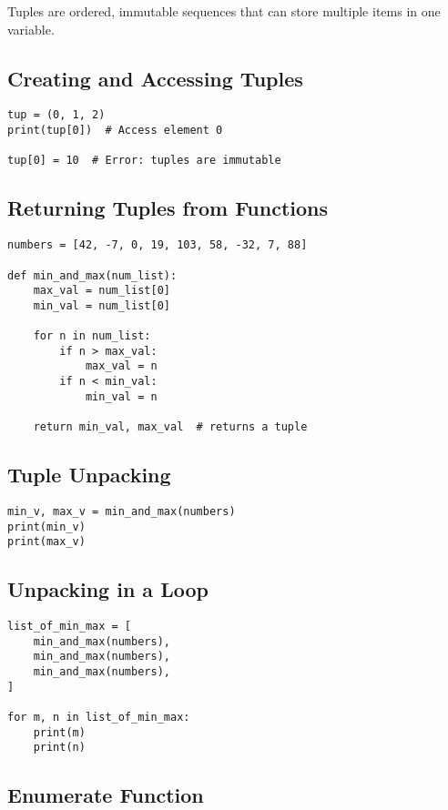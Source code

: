 \documentclass[11pt]{article}
\begin{document}
Tuples are ordered, immutable sequences that can store multiple items in one variable.

\subsection*{Creating and Accessing Tuples}

\begin{verbatim}
tup = (0, 1, 2)
print(tup[0])  # Access element 0

tup[0] = 10  # Error: tuples are immutable
\end{verbatim}

\subsection*{Returning Tuples from Functions}

\begin{verbatim}
numbers = [42, -7, 0, 19, 103, 58, -32, 7, 88]

def min_and_max(num_list):
    max_val = num_list[0]
    min_val = num_list[0]

    for n in num_list:
        if n > max_val:
            max_val = n
        if n < min_val:
            min_val = n

    return min_val, max_val  # returns a tuple
\end{verbatim}

\subsection*{Tuple Unpacking}

\begin{verbatim}
min_v, max_v = min_and_max(numbers)
print(min_v)
print(max_v)
\end{verbatim}

\subsection*{Unpacking in a Loop}

\begin{verbatim}
list_of_min_max = [
    min_and_max(numbers),
    min_and_max(numbers),
    min_and_max(numbers),
]

for m, n in list_of_min_max:
    print(m)
    print(n)
\end{verbatim}

\subsection*{Enumerate Function}
\end{document}
